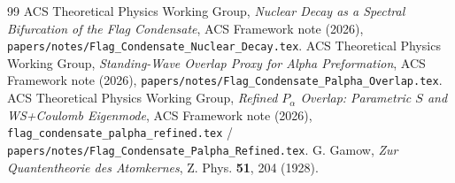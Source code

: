 \documentclass[11pt,a4paper]{article}
\theoremstyle{remark}
\begin{document}
\begin{thebibliography}{99}
  ACS Theoretical Physics Working Group,
  \emph{Nuclear Decay as a Spectral Bifurcation of the Flag Condensate},
  ACS Framework note (2026),
  \nolinkurl{papers/notes/Flag_Condensate_Nuclear_Decay.tex}.
  ACS Theoretical Physics Working Group,
  \emph{Standing-Wave Overlap Proxy for Alpha Preformation},
  ACS Framework note (2026),
  \nolinkurl{papers/notes/Flag_Condensate_Palpha_Overlap.tex}.
  ACS Theoretical Physics Working Group,
  \emph{Refined $P_\alpha$ Overlap: Parametric $S$ and WS+Coulomb Eigenmode},
  ACS Framework note (2026),
  \nolinkurl{flag_condensate_palpha_refined.tex} /
  \nolinkurl{papers/notes/Flag_Condensate_Palpha_Refined.tex}.
  G. Gamow, \emph{Zur Quantentheorie des Atomkernes},
  Z. Phys. \textbf{51}, 204 (1928).
\end{thebibliography}
\end{document}
